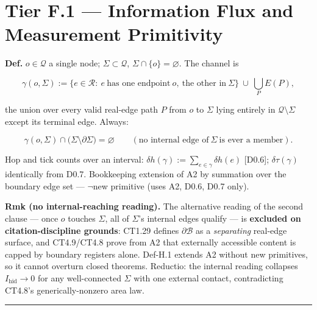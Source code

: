 \section[Tier F.1 — Information Flux and Measurement Primitivity]{\texorpdfstring{Tier F.1 — Information Flux and Measurement Primitivity}{Tier F.1 - Information Flux and Measurement Primitivity}}

\begin{definition}\label{tag:Def-H-1}
\textbf{Def.} $o\in\mathcal Q$ a single node; $\Sigma\subset\mathcal Q$, $\Sigma\cap\{o\}=\varnothing$. The channel is

\[
\gamma(o,\Sigma):=\bigl\{e\in\mathcal R:\ e\ \text{has one endpoint}\ o,\ \text{the other in}\ \Sigma\bigr\}\ \cup\ \bigcup_{P}E(P),
\]

the union over every valid real-edge path $P$ from $o$ to $\Sigma$ lying entirely in $\mathcal Q\setminus\Sigma$ except its terminal edge. Always:

\[
\gamma(o,\Sigma)\cap\bigl(\Sigma\setminus\partial\Sigma\bigr)=\varnothing\qquad(\text{no internal edge of}\ \Sigma\ \text{is ever a member}).
\]

Hop and tick counts over an interval: $ \delta h(\gamma):=\sum_{e\in\gamma}\delta h(e)$ [D0.6]; $ \delta\tau(\gamma)$ identically from D0.7. Bookkeeping extension of A2 by summation over the boundary edge set — $\neg$new primitive (uses A2, D0.6, D0.7 only).

\textbf{Rmk (no internal-reaching reading).} The alternative reading of the second clause — once $o$ touches $\Sigma$, all of $\Sigma$'s internal edges qualify — is \textbf{excluded on citation-discipline grounds}: CT1.29 defines $\partial\mathcal B$ as a \textit{separating} real-edge surface, and CT4.9/CT4.8 prove from A2 that externally accessible content is capped by boundary registers alone. Def-H.1 extends A2 without new primitives, so it cannot overturn closed theorems. Reductio: the internal reading collapses $I_{\mathrm{hid}}\to0$ for any well-connected $\Sigma$ with one external contact, contradicting CT4.8's generically-nonzero area law.

\vspace{2pt}\noindent\rule{\textwidth}{0.4pt}\vspace{2pt}

\end{definition}

